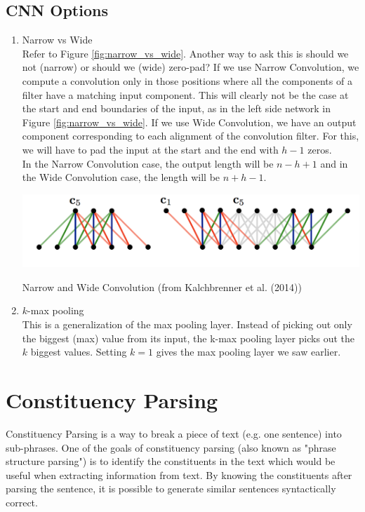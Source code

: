 \documentclass{tufte-handout}
\begin{document}
\subsection{CNN Options}
\begin{enumerate}
\item  Narrow vs Wide \\
Refer to Figure \ref{fig:narrow_vs_wide}. Another way to ask this is  should we not (narrow) or should we (wide) zero-pad? If we use Narrow Convolution, we compute a convolution only in those positions where all the components of a filter have a matching input component. This will clearly not be the case at the start and end boundaries of the input, as in the left side network in Figure \ref{fig:narrow_vs_wide}. If we use Wide Convolution, we have an output component corresponding to each alignment of the convolution filter. For this, we will have to pad the input at the start and the end with $h-1$ zeros. \\
In the Narrow Convolution case, the output length will be $n-h+1$ and in the Wide Convolution case, the length will be $n+h-1$.

\begin{marginfigure}%
  \includegraphics[width=\linewidth]{narrow_vs_wide}
  \caption{Narrow and Wide Convolution (from Kalchbrenner et al. (2014))}
  \label{fig:narrow_vs_wide}
\end{marginfigure}

\item  $k$-max pooling\\
This is a generalization of the max pooling layer. Instead of picking out only the biggest (max) value from its input, the k-max pooling layer picks out the $k$ biggest values. Setting $k=1$ gives the max pooling layer we saw  earlier.


\end{enumerate}


\section{Constituency Parsing}
Constituency Parsing is a way to break a piece of text (e.g. one sentence) into sub-phrases. One of the goals of constituency parsing (also known as "phrase structure parsing") is to identify the constituents in the text which would be useful when extracting information from text. By knowing the constituents after parsing the sentence, it is possible to generate similar sentences syntactically correct.
\end{document}
